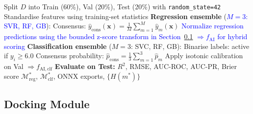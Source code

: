 \documentclass[conference]{IEEEtran}
\newcommand{\rev}[2]{\textcolor{blue}{#2}}
\begin{document}
\begin{algorithm}[!htbp]
\scriptsize
\caption{Consensus AI Ensemble Training}
\label{alg:ensemble}
Split $D$ into Train (60\%), Val (20\%), Test (20\%)
  with \texttt{random\_state=42}\;
Standardise features using training-set statistics\;
\BlankLine
\textbf{Regression ensemble} (\rev{R2.1}{$M = 3$: SVR, RF, GB}):\;
Consensus: $\hat{y}_{\mathrm{cons}}(\mathbf{x})
  = \frac{1}{M}\sum_{m=1}^{M} \hat{y}_m(\mathbf{x})$\;
\rev{R2.3}{Normalize regression predictions using the bounded
  z-score transform in Section~\ref{sec:docking}
  $\Rightarrow f_{\mathrm{AI}}$ for hybrid scoring}\;
\BlankLine
\textbf{Classification ensemble} ($M = 3$: SVC, RF, GB):\;
Binarise labels: active if $y_i \geq 6.0$\;
Consensus probability: $\hat{p}_{\mathrm{cons}}
  = \frac{1}{3}\sum_{m=1}^{3} \hat{p}_m$\;
Apply isotonic calibration on Val
  $\Rightarrow f_{\mathrm{AI,clf}}$\;
\BlankLine
\textbf{Evaluate on Test:}
  $R^2$, RMSE, AUC-ROC, AUC-PR, Brier score\;
\Return $\mathcal{M}_{\mathrm{reg}}^*$,
  $\mathcal{M}_{\mathrm{clf}}^*$,
  ONNX exports, $\{H(m^*)\}$\;
\end{algorithm}

\subsection{\textbf{Docking Module}}
\label{sec:docking}
\end{document}
